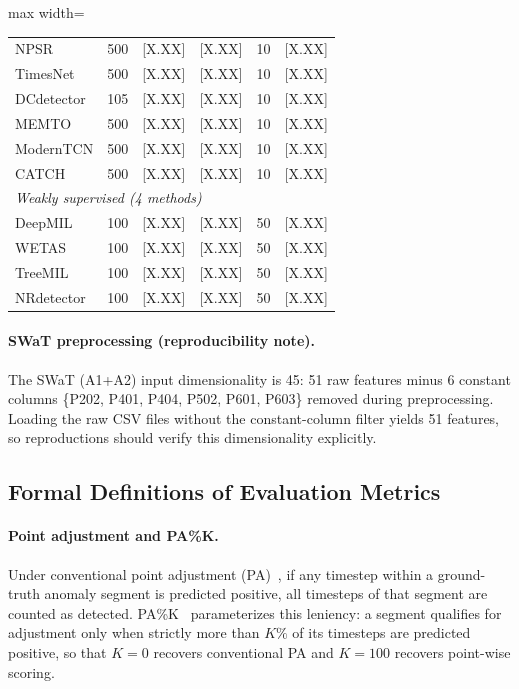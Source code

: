 \begin{table}[tp]
\begin{adjustbox}{max width=\linewidth}
\begin{tabular}{lccccl}
NPSR           & 500 & {[X.XX]} & {[X.XX]} & 10 & {[X.XX]} \\
TimesNet       & 500 & {[X.XX]} & {[X.XX]} & 10 & {[X.XX]} \\
DCdetector     & 105 & {[X.XX]} & {[X.XX]} & 10 & {[X.XX]} \\
MEMTO          & 500 & {[X.XX]} & {[X.XX]} & 10 & {[X.XX]} \\
ModernTCN      & 500 & {[X.XX]} & {[X.XX]} & 10 & {[X.XX]} \\
CATCH          & 500 & {[X.XX]} & {[X.XX]} & 10 & {[X.XX]} \\
\midrule
\multicolumn{6}{l}{\textit{Weakly supervised (4 methods)}} \\
DeepMIL        & 100 & {[X.XX]} & {[X.XX]} & 50 & {[X.XX]} \\
WETAS          & 100 & {[X.XX]} & {[X.XX]} & 50 & {[X.XX]} \\
TreeMIL        & 100 & {[X.XX]} & {[X.XX]} & 50 & {[X.XX]} \\
NRdetector     & 100 & {[X.XX]} & {[X.XX]} & 50 & {[X.XX]} \\
\bottomrule
\end{tabular}
\end{adjustbox}
\end{table}

\paragraph{SWaT preprocessing (reproducibility note).}
The SWaT (A1+A2) input dimensionality is 45: 51 raw features minus 6 constant columns
\{P202, P401, P404, P502, P601, P603\} removed during preprocessing.
Loading the raw CSV files without the constant-column filter yields 51 features, so reproductions
should verify this dimensionality explicitly.

\subsection{Formal Definitions of Evaluation Metrics}
\label{sec:appendix_metrics}

\paragraph{Point adjustment and PA\%K.}
Under conventional point adjustment (PA)~\cite{xu2018kpivae,kim2022rigorous}, if any timestep
within a ground-truth anomaly segment is predicted positive, all timesteps of that segment are
counted as detected.
PA\%K~\cite{kim2022rigorous} parameterizes this leniency: a segment qualifies for adjustment
only when strictly more than $K\%$ of its timesteps are predicted positive, so that $K=0$
recovers conventional PA and $K=100$ recovers point-wise scoring.

